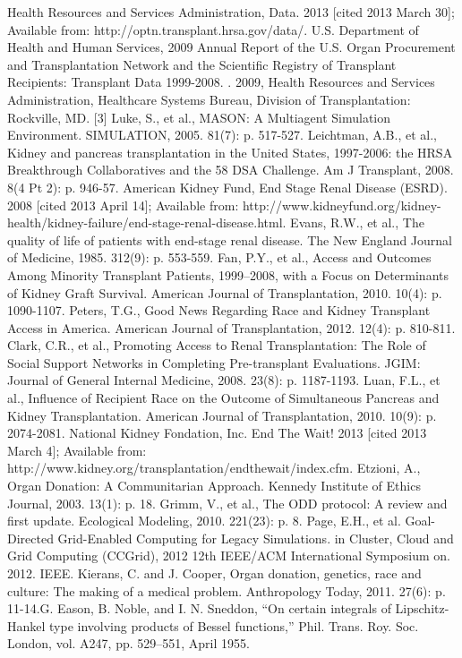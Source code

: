\documentclass[9pt,a4paper,twocolumn]{scrartcl}
\begin{document}
\begin{thebibliography}{1}
	 Health Resources and Services Administration, Data. 2013  [cited 2013 March 30]; Available from: http://optn.transplant.hrsa.gov/data/.
     U.S. Department of Health and Human Services, 2009 Annual Report of the U.S. Organ Procurement and Transplantation Network and the Scientific Registry of Transplant Recipients: Transplant Data 1999-2008. . 2009, Health Resources and Services Administration, Healthcare Systems Bureau, Division of Transplantation: Rockville, MD.
    	[3]	Luke, S., et al., MASON: A Multiagent Simulation Environment. SIMULATION, 2005. 81(7): p. 517-527.
     Leichtman, A.B., et al., Kidney and pancreas transplantation in the United States, 1997-2006: the HRSA Breakthrough Collaboratives and the 58 DSA Challenge. Am J Transplant, 2008. 8(4 Pt 2): p. 946-57.
     American Kidney Fund, End Stage Renal Disease (ESRD). 2008  [cited 2013 April 14]; Available from: http://www.kidneyfund.org/kidney-health/kidney-failure/end-stage-renal-disease.html.
     Evans, R.W., et al., The quality of life of patients with end-stage renal disease. The New England Journal of Medicine, 1985. 312(9): p. 553-559.
     Fan, P.Y., et al., Access and Outcomes Among Minority Transplant Patients, 1999–2008, with a Focus on Determinants of Kidney Graft Survival. American Journal of Transplantation, 2010. 10(4): p. 1090-1107.
     Peters, T.G., Good News Regarding Race and Kidney Transplant Access in America. American Journal of Transplantation, 2012. 12(4): p. 810-811.
     Clark, C.R., et al., Promoting Access to Renal Transplantation: The Role of Social Support Networks in Completing Pre-transplant Evaluations. JGIM: Journal of General Internal Medicine, 2008. 23(8): p. 1187-1193.
	 Luan, F.L., et al., Influence of Recipient Race on the Outcome of Simultaneous Pancreas and Kidney Transplantation. American Journal of Transplantation, 2010. 10(9): p. 2074-2081.
	 National Kidney Fondation, Inc. End The Wait! 2013  [cited 2013 March 4]; Available from: http://www.kidney.org/transplantation/endthewait/index.cfm.
	 Etzioni, A., Organ Donation: A Communitarian Approach. Kennedy Institute of Ethics Journal, 2003. 13(1): p. 18.
	 Grimm, V., et al., The ODD protocol: A review and first update. Ecological Modeling, 2010. 221(23): p. 8.
	 Page, E.H., et al. Goal-Directed Grid-Enabled Computing for Legacy Simulations. in Cluster, Cloud and Grid Computing (CCGrid), 2012 12th IEEE/ACM International Symposium on. 2012. IEEE.
	 Kierans, C. and J. Cooper, Organ donation, genetics, race and culture: The making of a medical problem. Anthropology Today, 2011. 27(6): p. 11-14.G. Eason, B. Noble, and I. N. Sneddon, “On certain integrals of Lipschitz-Hankel type involving products of Bessel functions,” Phil. Trans. Roy. Soc. London, vol. A247, pp. 529–551, April 1955.

\end{thebibliography}
\end{document}
